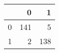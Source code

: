 \begin{tabular}{lrr}
\toprule
{} &    0 &    1 \\
\midrule
0 &  141 &    5 \\
1 &    2 &  138 \\
\bottomrule
\end{tabular}
